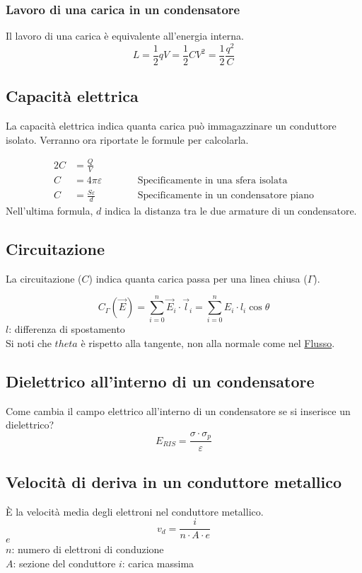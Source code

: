 \subsubsection{Lavoro di una carica in un condensatore}
Il lavoro di una carica è equivalente all'energia interna.
\begin{equation*}
L = \frac{1}{2}qV = \frac{1}{2}CV^2 = \frac{1}{2}\frac{q^2}{C}
\end{equation*}

\subsection{Capacità elettrica}\label{sub:elettrostatica:capacita}
La capacità elettrica indica quanta carica può immagazzinare un conduttore isolato. Verranno ora 
riportate le formule per calcolarla.

\begin{alignat*}{2}
C &= \frac{Q}{V} &\qquad &\\
C &= 4\pi\varepsilon & &\text{Specificamente in una sfera isolata}\\
C &= \frac{S\varepsilon}{d} & &\text{Specificamente in un condensatore piano}
\end{alignat*}
Nell'ultima formula, $d$ indica la distanza tra le due armature di un condensatore.

\subsection{Circuitazione}
La circuitazione ($C$) indica quanta carica passa per una linea chiusa ($\Gamma$).

\begin{equation*}
C_\Gamma\left(\vec{E}\right) = \sum\limits_{i=0}^{n}\vec{E}_i\cdot\vec{l}_i = 
\sum\limits_{i=0}^{n} E_i\cdot l_i\cos\theta
\end{equation*}
$l$: differenza di spostamento\\
Si noti che $theta$ è rispetto alla tangente, non alla normale come nel 
\hyperref[subsec:flusso]{Flusso}.

\subsection{Dielettrico all'interno di un condensatore}
Come cambia il campo elettrico all'interno di un condensatore se si inserisce un dielettrico?
\begin{equation*}
E_{RIS} = \frac{\sigma\cdot\sigma_p}{\varepsilon}
\end{equation*}

\subsection{Velocità di deriva in un conduttore metallico}
È la velocità media degli elettroni nel conduttore metallico.
\begin{equation*}
  v_d = \frac{i}{n\cdot A\cdot e}
\end{equation*}
\hyperref[tab:e-]{$e$}\\
$n$: numero di elettroni di conduzione\\
$A$: sezione del conduttore
$i$: carica massima

